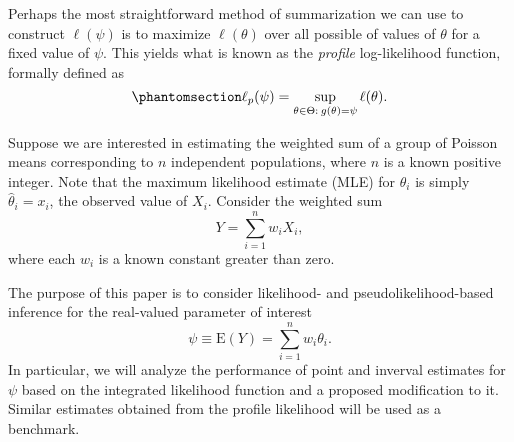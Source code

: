 \documentclass[
  12pt]{article}
\begin{document}
Perhaps the most straightforward method of summarization we can use to
construct \(\ell(\psi)\) is to maximize \(\ell(\theta)\) over all
possible of values of \(\theta\) for a fixed value of \(\psi\). This
yields what is known as the \emph{profile} log-likelihood function,
formally defined as \begin{equation}\phantomsection\label{eq-2}{
\ell_p(\psi) = \sup_{\theta \in \Theta: \> g(\theta) = \psi} \ell(\theta).
}\end{equation}

Suppose we are interested in estimating the weighted sum of a group of
Poisson means corresponding to \(n\) independent populations, where
\(n\) is a known positive integer. Note that the maximum likelihood
estimate (MLE) for \(\theta_i\) is simply \(\hat{\theta}_i = x_i\), the
observed value of \(X_i\). Consider the weighted sum
\[Y = \sum_{i=1}^n w_iX_i,\] where each \(w_i\) is a known constant
greater than zero.

The purpose of this paper is to consider likelihood- and
pseudolikelihood-based inference for the real-valued parameter of
interest \[\psi \equiv \text{E}(Y) = \sum_{i=1}^n w_i\theta_i.\] In
particular, we will analyze the performance of point and inverval
estimates for \(\psi\) based on the integrated likelihood function and a
proposed modification to it. Similar estimates obtained from the profile
likelihood will be used as a benchmark.


  
\end{document}
